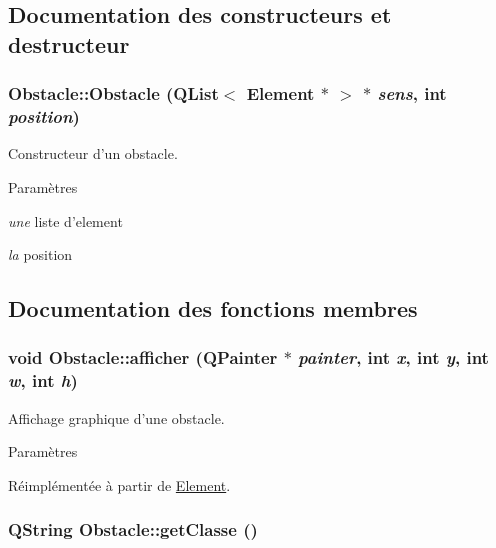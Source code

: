 \subsection{Documentation des constructeurs et destructeur}
\hypertarget{classObstacle_aaf39f191e411a16f1bd9573da092da04}{
\subsubsection[{Obstacle}]{\setlength{\rightskip}{0pt plus 5cm}Obstacle::Obstacle (QList$<$ {\bf Element} $\ast$ $>$ $\ast$ {\em sens}, \/  int {\em position})}}
\label{classObstacle_aaf39f191e411a16f1bd9573da092da04}


Constructeur d'un obstacle. 


\begin{DoxyParams}{Paramètres}
\item[{\em une}]liste d'element \item[{\em la}]position \end{DoxyParams}


\subsection{Documentation des fonctions membres}
\hypertarget{classObstacle_a77cfc135a2b1fdfe4fab6c7c3713a749}{
\subsubsection[{afficher}]{\setlength{\rightskip}{0pt plus 5cm}void Obstacle::afficher (QPainter $\ast$ {\em painter}, \/  int {\em x}, \/  int {\em y}, \/  int {\em w}, \/  int {\em h})}}
\label{classObstacle_a77cfc135a2b1fdfe4fab6c7c3713a749}


Affichage graphique d'une obstacle. 


\begin{DoxyParams}{Paramètres}
\item[{\em }]\end{DoxyParams}


Réimplémentée à partir de \hyperlink{classElement_aabcc968ccfa004f84bddda789441368b}{Element}.

\hypertarget{classObstacle_a7773466eaafb92cef0ec22f5cc79522c}{
\subsubsection[{getClasse}]{\setlength{\rightskip}{0pt plus 5cm}QString Obstacle::getClasse ()}}
\label{classObstacle_a7773466eaafb92cef0ec22f5cc79522c}


